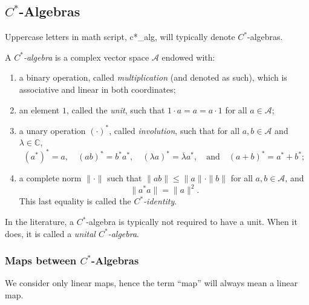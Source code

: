 \subsection{\( C^* \)-Algebras}

Uppercase letters in math script, \gls{c*_alg}, will typically denote $C^*$-algebras.


\begin{definition}
  A \emph{\( C^* \)-algebra} is a complex vector space \( \mathscr{A} \) endowed with:
\begin{enumerate}
    \item a binary operation, called \emph{multiplication} (and denoted as such), which is associative and linear in both coordinates;
    \item an element \( 1 \), called the \emph{unit}, such that \( 1 \cdot a = a = a \cdot 1 \) for all \( a \in \mathscr{A} \);
    \item a unary operation \( (\cdot)^* \), called \emph{involution}, such that for all \( a, b \in \mathscr{A} \) and \( \lambda \in \mathbb{C} \),
    \[
    (a^*)^* = a, \quad (ab)^* = b^* a^*, \quad (\lambda a)^* = \overline{\lambda} a^*, \quad \text{and} \quad (a + b)^* = a^* + b^*;
    \]
    \item a complete norm \( \|\cdot\| \) such that \( \| ab \| \leq \|a\| \cdot \|b\| \) for all \( a, b \in \mathscr{A} \), and
    \[
    \|a^* a\| = \|a\|^2.
    \]
    This last equality is called the \emph{\( C^* \)-identity}.
\end{enumerate}
\end{definition}


\begin{remark}  
  In the literature, a \( C^* \)-algebra is typically not required to have a unit. When it does, it is called a \emph{unital \( C^* \)-algebra}.
\end{remark}



\subsubsection{Maps between $C^*$-Algebras}

We consider only linear maps, hence the term ``map'' will always mean a linear map.


